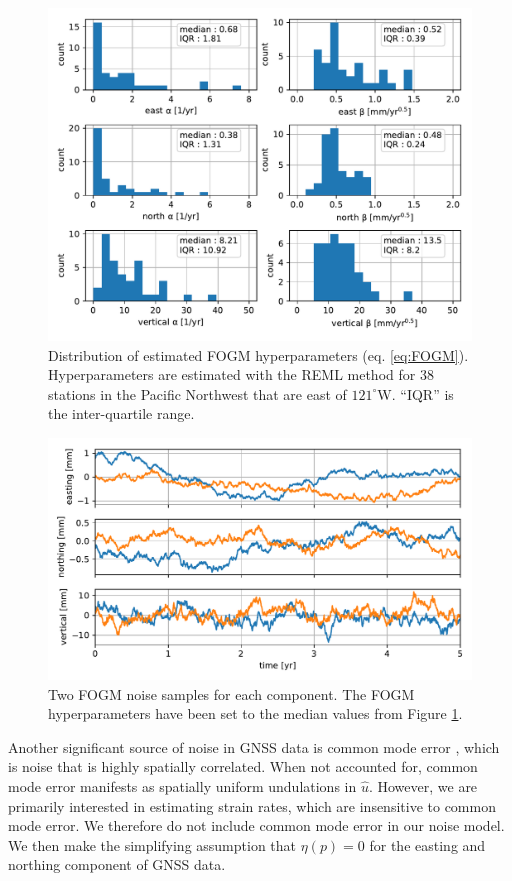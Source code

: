 \documentclass[10pt,letter]{article}
\begin{document}
\begin{figure}
\includegraphics{figures/noise/noise-params.pdf}
\caption{Distribution of estimated FOGM hyperparameters (eq. \ref{eq:FOGM}). Hyperparameters are estimated with the REML method for 38 stations in the Pacific Northwest that are east of $121^\circ$W. ``IQR'' is the inter-quartile range.}   
\label{fig:NoiseParams}
\end{figure}

\begin{figure}
\includegraphics{figures/noise/noise-samples.pdf}
\caption{Two FOGM noise samples for each component. The FOGM hyperparameters have been set to the median values from Figure \ref{fig:NoiseParams}.}   
\label{fig:NoiseSamples}
\end{figure}

Another significant source of noise in GNSS data is common mode error \citep[e.g.,][]{Wdowinski1997,Dong2006}, which is noise that is highly spatially correlated. When not accounted for, common mode error manifests as spatially uniform undulations in $\hat{u}$. However, we are primarily interested in estimating strain rates, which are insensitive to common mode error. We therefore do not include common mode error in our noise model. We then make the simplifying assumption that $\eta(p) = 0$ for the easting and northing component of GNSS data.            
\end{document}
